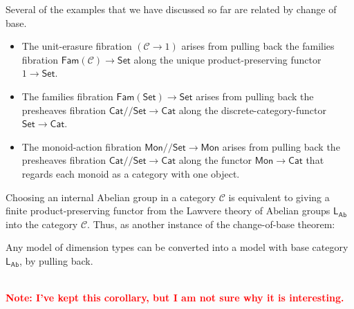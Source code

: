 \documentclass[a4paper,UKenglish]{lipics}
\newcommand\note[1]{{ \bf \textcolor{red} {\vspace{2mm}\; \\ Note: #1\\}}}
\newcommand{\ra}{\rightarrow}
\newcommand{\msf}[1]{\mathsf{#1}} %
\newcommand{\Mon}{\msf{Mon}}
\newcommand{\Set}{\msf{Set}}
\newcommand{\Cat}{\msf{Cat}}
\newcommand{\Fam}[1]{\msf{Fam}(#1)}
\newcommand{\LAb}{\msf{L}_{\msf{Ab}}}
\newcommand{\terminal}{\msf{1}}
\newcommand{\B}{\mathcal{B}}
\newcommand{\C}{\mathcal{C}}
\newcommand{\E}{\mathcal{E}}
\newcommand{\GroupSet}[1]{#1/\!/\Set}
\newcommand{\MonSet}{\GroupSet{\Mon}}
\newcommand{\CatSet}{\GroupSet{\Cat}}
\newcommand{\num}{\msf{quantity}}
\begin{document}
Several of the examples that we have discussed so far are related by change of base.
\begin{itemize}
\item The unit-erasure fibration $(\C\to 1)$ arises from pulling back the families fibration
$\Fam\C\to\Set$ along the unique product-preserving functor $1\to\Set$.
\item The families fibration $\Fam\Set\to\Set$ arises from pulling back the presheaves fibration
$\CatSet\to\Cat$ along the discrete-category-functor $\Set\to\Cat$.
\item The monoid-action fibration $\MonSet\to\Mon$ arises from pulling
  back the presheaves fibration $\CatSet\to\Cat$ along the functor
  $\Mon\to\Cat$ that regards each monoid as a category with one
  object.
\end{itemize}

Choosing an internal Abelian group in a category $\C$ is equivalent to giving a finite product-preserving functor from the
Lawvere theory of Abelian groups $\LAb$ into the category $\C$.
Thus, as another instance of the change-of-base theorem:


\begin{corollary}
  Any model of dimension types
  can be converted into a model with base category $\LAb$, by pulling back.
\end{corollary}
\note{I've kept this corollary, but I am not sure why it is interesting.}
\end{document}

